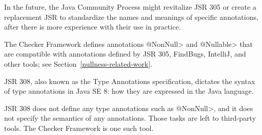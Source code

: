 In the future, the Java Community Process might revitalize JSR 305 or
create a replacement JSR to standardize the names and
meanings of specific annotations, after there is more experience with their
use in practice.



The Checker Framework defines annotations \<@NonNull> and \<@Nullable> that
are compatible with annotations defined by JSR 305, FindBugs, IntelliJ, and
other tools; see Section~\ref{nullness-related-work}.



JSR 308, also known as the Type Annotations specification, dictates the
syntax of type annotations in Java SE 8:  how they are expressed in the
Java language.

JSR 308 does not define any type annotations such as \<@NonNull>, and it does
not specify the semantics of any annotations.  Those tasks are left to
third-party tools.  The Checker Framework is one such tool.


